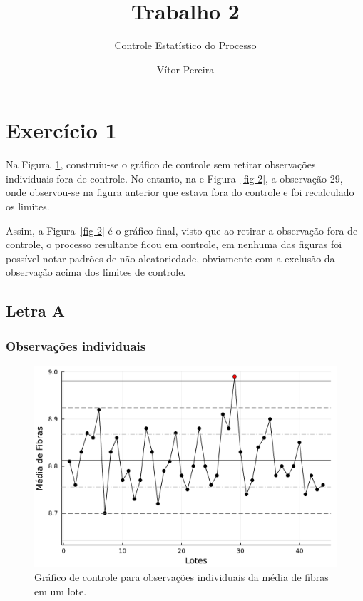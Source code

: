 \documentclass[
  letterpaper,
  DIV=11,
  numbers=noendperiod]{scrartcl}
\title{Trabalho 2}
\subtitle{Controle Estatístico do Processo}
\author{Vítor Pereira}
\date{}
\begin{document}
\maketitle
\ifdefined\Shaded\renewenvironment{Shaded}{\begin{tcolorbox}[enhanced, frame hidden, interior hidden, boxrule=0pt, borderline west={3pt}{0pt}{shadecolor}, breakable, sharp corners]}{\end{tcolorbox}}\fi

\hypertarget{exercuxedcio-1}{%
\section{Exercício 1}\label{exercuxedcio-1}}

Na Figura~\ref{fig-1}, construiu-se o gráfico de controle sem retirar
observações individuais fora de controle. No entanto, na e
Figura~\ref{fig-2}, a observação 29, onde observou-se na figura anterior
que estava fora do controle e foi recalculado os limites.

Assim, a Figura~\ref{fig-2} é o gráfico final, visto que ao retirar a
observação fora de controle, o processo resultante ficou em controle, em
nenhuma das figuras foi possível notar padrões de não aleatoriedade,
obviamente com a exclusão da observação acima dos limites de controle.

\hypertarget{letra-a}{%
\subsection{Letra A}\label{letra-a}}

\hypertarget{observauxe7uxf5es-individuais}{%
\subsubsection{Observações
individuais}\label{observauxe7uxf5es-individuais}}

\begin{figure}[H]

{\centering \includegraphics{relatorio_files/figure-pdf/fig-1-J1.pdf}

}

\caption{\label{fig-1}Gráfico de controle para observações individuais
da média de fibras em um lote.}

\end{figure}
\end{document}

